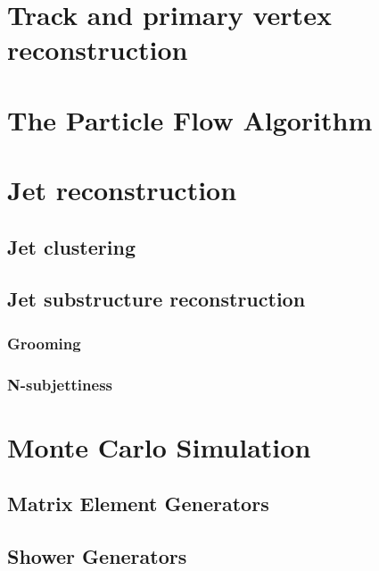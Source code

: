 \section{Track and primary vertex reconstruction}
\section{The Particle Flow Algorithm}
\section{Jet reconstruction}
\subsection{Jet clustering}
\subsection{Jet substructure reconstruction}
\subsubsection{Grooming}
\subsubsection{N-subjettiness}
\section{Monte Carlo Simulation}
\subsection{Matrix Element Generators}
\subsection{Shower Generators}
